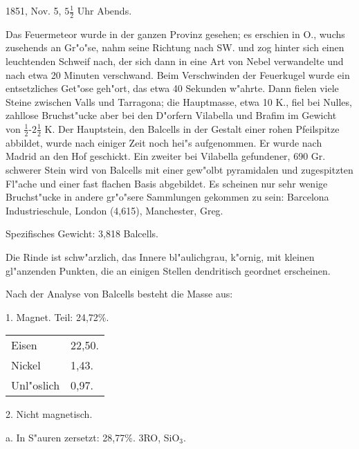 \documentclass[a4paper, 11pt, oneside]{article}
\begin{document}
1851, Nov. 5, $\mathfrak{5\frac{1}{2}}$ Uhr Abends.

Das Feuermeteor wurde in der ganzen Provinz gesehen; es erschien in O., wuchs zusehends an Gr"o"se, nahm seine Richtung nach SW. und zog hinter sich einen leuchtenden Schweif nach, der sich dann in eine Art von Nebel verwandelte und nach etwa 20 Minuten verschwand. Beim Verschwinden der Feuerkugel wurde ein entsetzliches Get"ose geh"ort, das etwa 40 Sekunden w"ahrte. Dann fielen viele Steine zwischen Valls und Tarragona; die Hauptmasse, etwa 10 K., fiel bei Nulles, zahllose Bruchst"ucke aber bei den D"orfern Vilabella und Brafim im Gewicht von $\mathfrak{\frac{1}{2}}$-$\mathfrak{2\frac{1}{2}}$ K. Der Hauptstein, den Balcells in der Gestalt einer rohen Pfeilspitze abbildet, wurde nach einiger Zeit noch hei"s aufgenommen. Er wurde nach Madrid an den Hof geschickt. Ein zweiter bei Vilabella gefundener, 690 Gr. schwerer Stein wird von Balcells mit einer gew"olbt pyramidalen und zugespitzten Fl"ache und einer fast flachen Basis abgebildet. Es scheinen nur sehr wenige Bruchst"ucke in andere gr"o"sere Sammlungen gekommen zu sein: Barcelona Industrieschule, London (4,615), Manchester, Greg.

Spezifisches Gewicht: 3,818 Balcells.

Die Rinde ist schw"arzlich, das Innere bl"aulichgrau, k"ornig, mit kleinen gl"anzenden Punkten, die an einigen Stellen dendritisch geordnet erscheinen.

Nach der Analyse von Balcells besteht die Masse aus:
\begin{center}
1. Magnet. Teil: 24,72\%.
\end{center}

\begin{table}[H]
    \centering\swabfamily\Large
    \begin{tabular}{l l}
    \hline
        Eisen & 22,50. \\
        Nickel & 1,43. \\
        Unl"oslich & 0,97. \\
    \end{tabular}
\end{table}

\begin{center}
2. Nicht magnetisch.
\end{center}

\begin{center}
a. In S"auren zersetzt: 28,77\%. 3RO, SiO$_{3}$.
\end{center}
\end{document}
